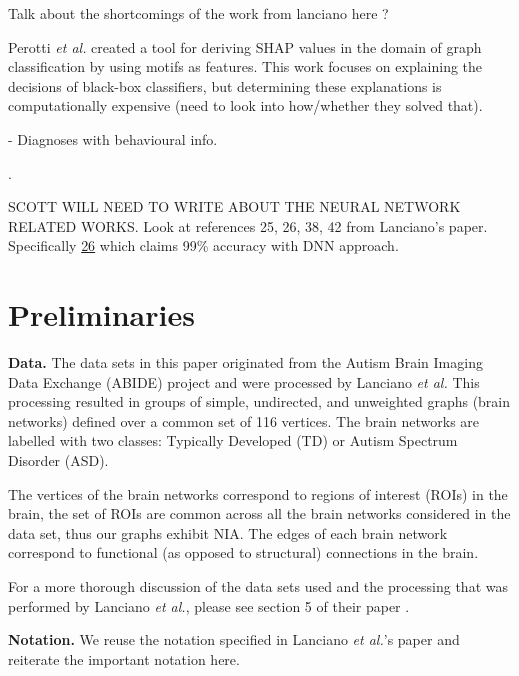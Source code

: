 \documentclass[sigconf]{acmart}
\begin{document}
Talk about the shortcomings of the work from lanciano here \cite{lanciano2020}?

Perotti \emph{et al.} created a tool for deriving SHAP values in the domain of graph classification by using motifs as features.
This work focuses on explaining the decisions of black-box classifiers, but determining these explanations is computationally expensive (need to look into how/whether they solved that).

\cite{abbas2020} - Diagnoses with behavioural info.

\cite{thomas2020}
\cite{sewani2020}.

\cite{kong2019}
\cite{perotti2022}
\cite{coupette2022}

SCOTT WILL NEED TO WRITE ABOUT THE NEURAL NETWORK RELATED WORKS. Look at references 25, 26, 38, 42 from Lanciano's paper. Specifically \href{https://ieeexplore.ieee.org/document/8970823}{26} which claims 99\% accuracy with DNN approach.

\section{Preliminaries}
\textbf{Data.}
The data sets in this paper originated from the Autism Brain Imaging Data Exchange (ABIDE) project \cite{craddock2013} and were processed by Lanciano \emph{et al.}
This processing resulted in groups of simple, undirected, and unweighted graphs (brain networks) defined over a common set of 116 vertices.
The brain networks are labelled with two classes: Typically Developed (TD) or Autism Spectrum Disorder (ASD).

The vertices of the brain networks correspond to regions of interest (ROIs) in the brain, the set of ROIs are common across all the brain networks considered in the data set, thus our graphs exhibit NIA.
The edges of each brain network correspond to functional (as opposed to structural) connections in the brain.

For a more thorough discussion of the data sets used and the processing that was performed by Lanciano \emph{et al.}, please see section 5 of their paper \cite{lanciano2020}.

\textbf{Notation.}
We reuse the notation specified in Lanciano \emph{et al.}'s paper and reiterate the important notation here.
\end{document}
